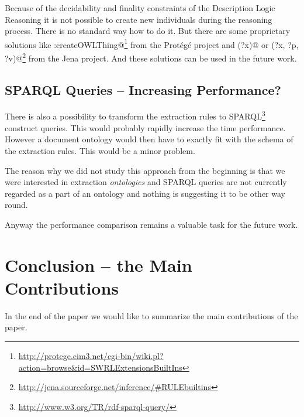 Because of the decidability and finality constraints of the Description Logic Reasoning it is not possible to create new individuals during the reasoning process. There is no standard way how to do it. But there are some proprietary solutions like \verb@swrlx:createOWLThing@\footnote{\url{http://protege.cim3.net/cgi-bin/wiki.pl?action=browse&id=SWRLExtensionsBuiltIns}} from the Prot\'{e}g\'{e} project and \verb@makeTemp(?x)@ or \verb@makeInstance(?x, ?p, ?v)@\footnote{\url{http://jena.sourceforge.net/inference/#RULEbuiltins}} from the Jena project.
And these solutions can be used in the future work. 

\subsection{SPARQL Queries -- Increasing Performance?}

There is also a possibility to transform the extraction rules to SPARQL\footnote{\url{http://www.w3.org/TR/rdf-sparql-query/}} construct queries. This would probably rapidly increase the time performance. However a document ontology would then have to exactly fit with the schema of the extraction rules.  This would be a minor problem. 

The reason why we did not study this approach from the beginning is that we were interested in extraction \emph{ontologies} and SPARQL queries are not currently regarded as a part of an ontology and nothing is suggesting it to be other way round.  

Anyway the performance comparison remains a valuable task for the future work.






\section{Conclusion -- the Main Contributions}

In the end of the paper we would like to summarize the main contributions of the paper.

